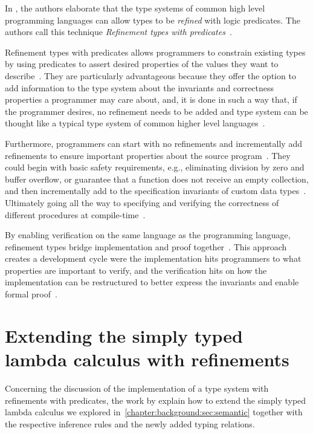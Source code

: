 \documentclass[
  oneside,
  english,
  coorientadorbanca,
  noabntexcite
]{ufsc-thesis-rn46-2019}
\begin{document}
In \textcite{jhala2020tutorial}, the authors elaborate that the type systems of common high level programming languages can allow types to be \textit{refined} with logic predicates.
The authors call this technique \textit{Refinement types with predicates}~\cite{jhala2020tutorial}.

Refinement types with predicates allows programmers to constrain existing types by using predicates to assert desired properties of the values they want to describe~\cite{jhala2020tutorial}.
They are particularly advantageous because they offer the option to add information to the type system about the invariants and correctness properties a programmer may care about, and, it is done in such a way that, if the programmer desires, no refinement needs to be added and type system can be thought like a typical type system of common higher level languages~\cite{jhala2020tutorial}.

Furthermore, programmers can start with no refinements and incrementally add refinements to ensure important properties about the source program~\cite{jhala2020tutorial}.
They could begin with basic safety requirements, e.g., eliminating division by zero and buffer overflow, or guarantee that a function does not receive an empty collection, and then incrementally add to the specification invariants of custom data types~\cite{jhala2020tutorial}.
Ultimately going all the way to specifying and verifying the correctness of different procedures at compile-time~\cite{jhala2020tutorial}.

By enabling verification on the same language as the programming language, refinement types bridge implementation and proof together~\cite{jhala2020tutorial}.
This approach creates a development cycle were the implementation hits programmers to what properties are important to verify, and the verification hits on how the implementation can be restructured to better express the invariants and enable formal proof~\cite{jhala2020tutorial}.


\section{Extending the simply typed lambda calculus with refinements}\label{sec:simply_typed_lambda_calculus_with_refinements}

Concerning the discussion of the implementation of a type system with refinements with predicates, the work by \textcite{jhala2020tutorial} explain how to extend the simply typed lambda calculus we explored in~\cref{chapter:background:sec:semantic} together with the respective inference rules and the newly added typing relations.
\end{document}
